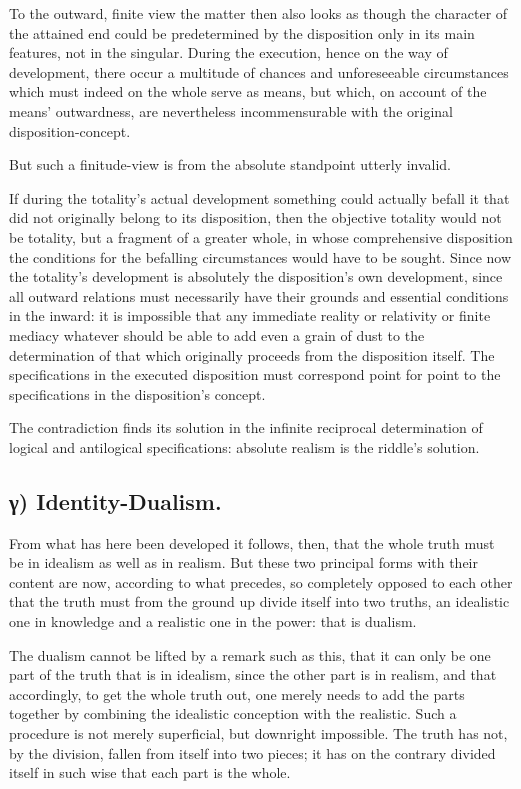 \documentclass[12pt]{book}
\begin{document}
To the outward, finite view the matter then also looks as though the
character of the attained end could be predetermined by the
disposition only in its main features, not in the singular. During
the execution, hence on the way of development, there occur a
multitude of chances and unforeseeable circumstances which must
indeed on the whole serve as means, but which, on account of the
means' outwardness, are nevertheless incommensurable with the
original disposition-concept.

But such a finitude-view is from the absolute standpoint utterly
invalid.

If during the totality's actual development something could actually
befall it that did not originally belong to its disposition, then
the objective totality would not be totality, but a fragment of a
greater whole, in whose comprehensive disposition the conditions for
the befalling circumstances would have to be sought. Since now the
totality's development is absolutely the disposition's own
development, since all outward relations must necessarily have their
grounds and essential conditions in the inward: it is impossible
that any immediate reality or relativity or finite mediacy whatever
should be able to add even a grain of dust to the determination of
that which originally proceeds from the disposition itself. The
specifications in the executed disposition must correspond point for
point to the specifications in the disposition's concept.

The contradiction finds its solution in the infinite reciprocal
determination of logical and antilogical specifications: absolute
realism is the riddle's solution.

\subsection*{γ) Identity-Dualism.}

From what has here been developed it follows,
then, that the whole truth must be in idealism as well as in
realism. But these two principal forms with their content are now,
according to what precedes, so completely opposed to each other that
the truth must from the ground up divide itself into two truths, an
idealistic one in knowledge and a realistic one in the power: that
is dualism.

The dualism cannot be lifted by a remark such as this, that it can
only be one part of the truth that is in idealism, since the other
part is in realism, and that accordingly, to get the whole truth
out, one merely needs to add the parts together by combining the
idealistic conception with the realistic. Such a procedure is not
merely superficial, but downright impossible. The truth has not, by
the division, fallen from itself into two pieces; it has on the
contrary divided itself in such wise that each part is the whole.
\end{document}

